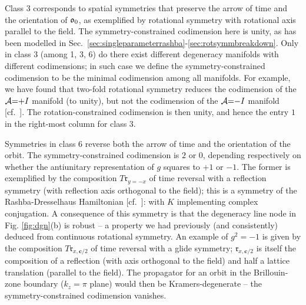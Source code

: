 \documentclass[aps, prb, showpacs, twocolumn, notitlepage, superscriptaddress]{revtex4-1}
\begin{document}

Class 3 corresponds to spatial symmetries that preserve the arrow of time and the orientation of $\mathfrak{o}_0$, as exemplified by rotational symmetry with rotational axis parallel to the field. The symmetry-constrained codimension here is unity, as has been modelled in Sec.\ \ref{sec:singleparameterrashba}-\ref{sec:rotsymmbreakdown}.  Only in class 3 (among 1, 3, 6) do there exist different  degeneracy manifolds with different codimensions; in such case we define the symmetry-constrained codimension to be the minimal codimension among all manifolds. For example, we have found that two-fold rotational symmetry reduces the codimension of the ${\cal A}{=}{+}I$ manifold (to unity), but not the codimension of the ${\cal A}{=}{-}I$ manifold [cf.\ ]. The rotation-constrained codimension is then unity, and hence the entry $1$ in the right-most column for class 3. 




Symmetries in class 6 reverse both the arrow of time and the orientation of the orbit. The symmetry-constrained codimension is $2$ or $0$, depending respectively on whether the antiunitary representation of $g$ squares to $+1$ or $-1$. The former is exemplified by the composition $T\mathfrak{r}_{y=-x}$ of time reversal with a reflection symmetry (with reflection axis orthogonal to the field); this is a symmetry of the Rashba-Dresselhaus Hamiltonian [cf.\ ]:
with $K$ implementing complex conjugation. A consequence of this symmetry is that the degeneracy line node in Fig. \ref{fig:dgn}(b) is robust -- a property we had previously (and consistently) deduced from continuous rotational symmetry. An example of $g^2{=}-1$ is given by
the composition $T\mathfrak{r}_{x,\boldsymbol{c}/2}$ of time reversal with a glide symmetry; $\mathfrak{r}_{x,\boldsymbol{c}/2}$ is itself the composition of a reflection (with axis orthogonal to the field) and half a lattice translation (parallel to the field). The propagator for an orbit in the Brillouin-zone boundary ($k_z{=}\pi$ plane) would then be Kramers-degenerate -- the symmetry-constrained codimension vanishes.

\end{document}
